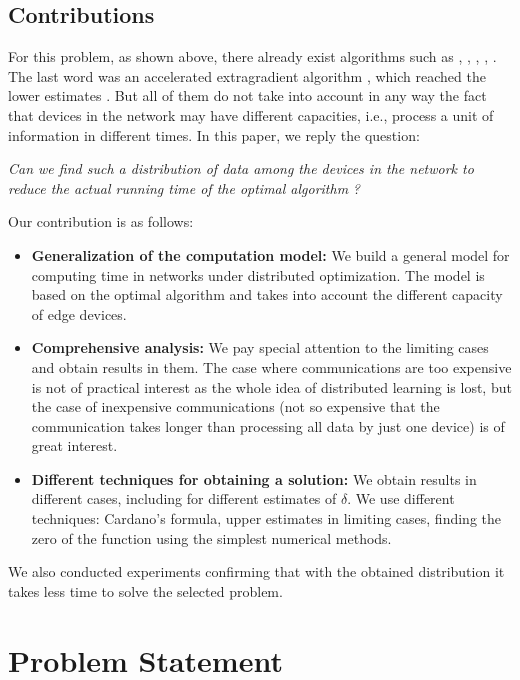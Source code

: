 \documentclass{article}
\begin{document}
\subsection{Contributions}

For this problem, as shown above, there already exist algorithms such as \cite{tian2022acceleration}, \cite{sun2022distributed}, \cite{reddi2016aide}, \cite{hendrikx2020statistically}, \cite{beznosikov2021distributed}. The last word was an accelerated extragradient algorithm \cite{kovalev2022optimal}, which reached the lower estimates \cite{arjevani2015communication}. But all of them do not take into account in any way the fact that devices in the network may have different capacities, i.e., process a unit of information in different times. In this paper, we reply the question: 
\begin{center}
    \textit{ Can we find such a distribution of data among the devices in the network to reduce the actual running time of the optimal algorithm} \citep{kovalev2022optimal}\textit{?}
\end{center}
Our contribution is as follows:
\begin{itemize}
    \item \textbf{Generalization of the computation model:} We build a general model for computing time in networks under distributed optimization. The model is based on the optimal algorithm \cite{kovalev2022optimal} and takes into account the different capacity of edge devices.
    \item \textbf{Comprehensive analysis:} We pay special attention to the limiting cases and obtain results in them. The case where communications are too expensive is not of practical interest as the whole idea of distributed learning is lost, but the case of inexpensive communications (not so expensive that the communication takes longer than processing all data by just one device) is of great interest. 
    \item \textbf{Different techniques for obtaining a solution:} We obtain results in different cases, including for different estimates of $\delta$. We use different techniques: Cardano's formula, upper estimates in limiting cases, finding the zero of the function using the simplest numerical methods.
\end{itemize}
 We also conducted experiments confirming that with the obtained distribution it takes less time to solve the selected problem.

\section{Problem Statement}
\end{document}
